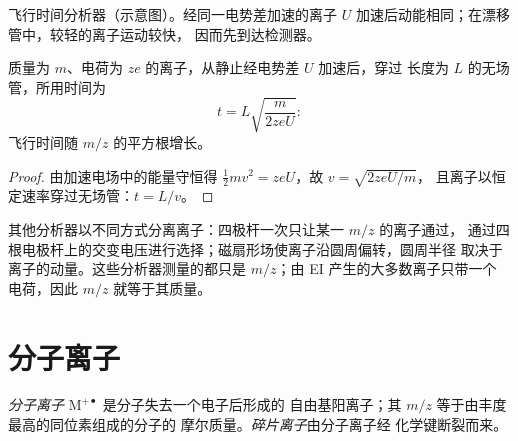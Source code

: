 \begin{omfigure}
\par\vspace{4pt}

{\small 飞行时间分析器（示意图）。经同一电势差加速的离子
$U$ 加速后动能相同；在漂移管中，较轻的离子运动较快，
因而先到达检测器。}
\end{omfigure}

\begin{proposition}[飞行时间]\label{prop:b2:mass-spec-atomic:time-of-flight}
质量为 $m$、电荷为 $ze$ 的离子，从静止经电势差 $U$ 加速后，穿过
长度为 $L$ 的无场管，所用时间为
\begin{equation*}
t = L\sqrt{\frac{m}{2zeU}}:
\end{equation*}
飞行时间随 $m/z$ 的平方根增长。
\end{proposition}

\begin{proof}
由加速电场中的能量守恒得 $\tfrac12mv^2 = zeU$，故 $v = \sqrt{2zeU/m}$，
且离子以恒定速率穿过无场管：$t = L/v$。
\end{proof}

其他分析器以不同方式分离离子：四极杆一次只让某一 $m/z$ 的离子通过，
通过四根电极杆上的交变电压进行选择；磁扇形场使离子沿圆周偏转，圆周半径
取决于离子的动量。这些分析器测量的都只是 $m/z$；由 EI 产生的大多数离子只带一个
电荷，因此 $m/z$ 就等于其质量。

\section{分子离子}

\begin{definition}[分子离子与碎片离子]\label{def:b2:mass-spec-atomic:molecular-ion}
\emph{分子离子} $\mathrm M^{+\bullet}$ 是分子失去一个电子后形成的
自由基阳离子；其 $m/z$ 等于由丰度最高的同位素组成的分子的
摩尔质量。\emph{碎片离子}由分子离子经
化学键断裂而来。
\end{definition}

